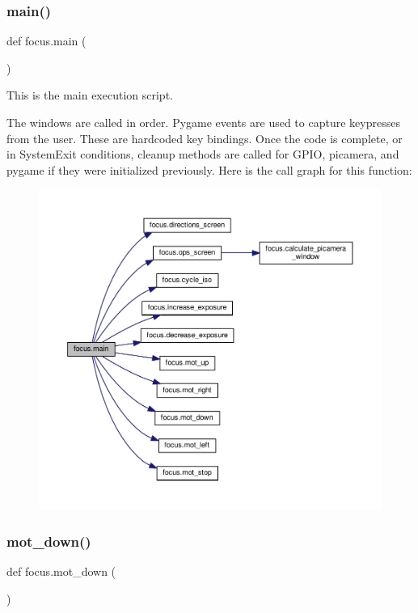 \subsubsection{\texorpdfstring{main()}{main()}}
{\footnotesize\ttfamily def focus.\+main (\begin{DoxyParamCaption}{ }\end{DoxyParamCaption})}



This is the main execution script. 

The windows are called in order. Pygame events are used to capture keypresses from the user. These are hardcoded key bindings. Once the code is complete, or in System\+Exit conditions, cleanup methods are called for G\+P\+IO, picamera, and pygame if they were initialized previously. Here is the call graph for this function\+:
\nopagebreak
\begin{figure}[H]
\begin{center}
\leavevmode
\includegraphics[width=350pt]{namespacefocus_a813bbce9c83fa23eae05039332cf3d8a_cgraph}
\end{center}
\end{figure}
\mbox{\label{namespacefocus_ab92c9c6869b0af6ce3a5920ef8554190}} 
\subsubsection{\texorpdfstring{mot\+\_\+down()}{mot\_down()}}
{\footnotesize\ttfamily def focus.\+mot\+\_\+down (\begin{DoxyParamCaption}{ }\end{DoxyParamCaption})}



